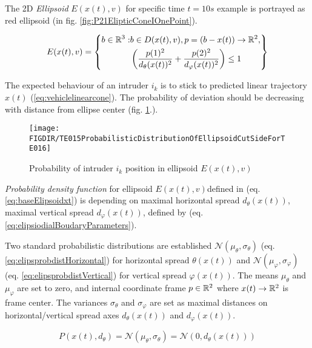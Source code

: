 The 2D \emph{Ellipsoid} $E({x}(t),{v})$ for specific time $t=10s$ example is portrayed  as red ellipsoid (in fig. \ref{fig:P21ElipticConeIOnePoint}).

\begin{equation}\label{eq:baseElipsoidxt}
    E({x}(t),{v})=\left\{ \begin{aligned}{b}\in\mathbb{R}^3:&{b}\in D({x}(t),{v}),{p}=({b}-{x}(t))\to\mathbb{R}^2,\\&\left(\frac{p(1)^2} {d_\theta({x}(t))^2}+ \frac{p(2)^2}{d_\varphi({x}(t))^2}\right)\le 1\end{aligned}\right\}
\end{equation}

\noindent The expected behaviour of an intruder $i_k$ is to stick to predicted linear trajectory ${x}(t)$ (\ref{eq:vehiclelinearcone}). The probability of deviation should be decreasing with distance from ellipse center (fig. \ref{fig:intruderPassingProbability}.).  
\begin{figure}[H]
    \centering
    \texttt{[image: \\FIGDIR/TE015ProbabilisticDistributionOfEllipsoidCutSideForTE016]}
    \caption{Probability of intruder $i_k$ position in ellipsoid $E({x}(t),{v})$}
    \label{fig:intruderPassingProbability}
\end{figure}

\noindent \emph{Probability density function} for ellipsoid  $E({x}(t),{v})$defined in (eq. \ref{eq:baseElipsoidxt}) is depending on maximal horizontal spread $d_\theta({x}(t))$, maximal vertical spread $d_\varphi({x}(t))$, defined by (eq. \ref{eq:elipsiodialBoudaryParameters}). 

Two standard probabilistic distributions are established $\mathscr{N}(\mu_\theta,\sigma_\theta)$ (eq. \ref{eq:elipsprobdistHorizontal}) for horizontal spread $\theta({x}(t))$ and $\mathscr{N}(\mu_\varphi,\sigma_\varphi)$  (eq. \ref{eq:elipsprobdistVertical}) for vertical spread $\varphi({x}(t))$. The means $\mu_\theta$ and $\mu_\varphi$ are set to zero, and internal coordinate frame ${p}\in\mathbb{R}^2$ where ${x}(t)\to\mathbb{R}^2$ is frame center. The variances $\sigma_\theta$ and $\sigma_\varphi$ are set as maximal distances on horizontal/vertical spread axes $d_\theta({x}(t))$ and $d_\varphi({x}(t))$.

\begin{equation}\label{eq:elipsprobdistHorizontal}
    P({x}(t),d_\theta)=\mathscr{N}(\mu_\theta,\sigma_\theta)=\mathscr{N}(0,d_\theta({x}(t)))
\end{equation}

